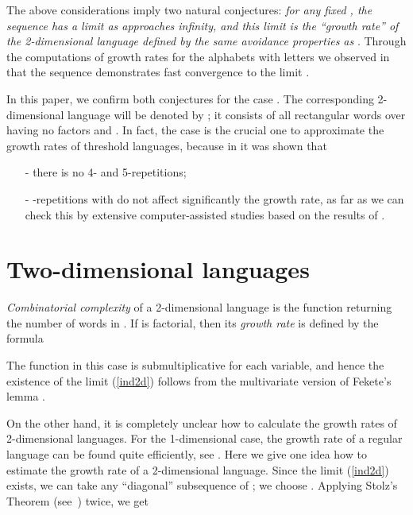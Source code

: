 \documentclass[submission,copyright]{eptcs}\providecommand{\event}{WORDS 2011}
\begin{document}
\smallskip
The above considerations imply two natural conjectures: \textit{for any fixed , the sequence  has a limit as  approaches infinity, and this limit is the ``growth rate'' of the 2-dimensional language defined by the same avoidance properties as }. Through the computations of growth rates for the alphabets with  letters we observed in \cite{ShGo} that the sequence  demonstrates fast convergence to the limit .

In this paper, we confirm both conjectures for the case . The corresponding 2-dimen\-sional language will be denoted by ; it consists of all rectangular words over  having no factors  and .
In fact, the case  is the crucial one to approximate the growth rates of threshold languages, because in \cite{ShGo} it was shown that
\begin{itemize}
\item[-] there is no 4- and 5-repetitions;
\item[-] -repetitions with  do not affect significantly the growth rate, as far as we can check this by extensive computer-assisted studies based on the results of \cite{Sh1}.
\end{itemize}

\section {Two-dimensional languages}
\textit{Combinatorial complexity}  of a 2-dimensional language  is the function returning the number of  words in . If  is factorial, then its \textit{growth rate} is defined by the formula 

The function  in this case is submultiplicative for each variable, and hence the existence of the limit (\ref{ind2d}) follows from the multivariate version of Fekete's lemma \cite{Cap}.

On the other hand, it is completely unclear how to calculate the growth rates of 2-dimensional languages. For the 1-dimensional case, the growth rate of a regular language can be found quite efficiently, see \cite{Sh1}. Here we give one idea how to estimate the growth rate of a 2-dimen\-sional language. Since the limit (\ref{ind2d}) exists, we can take any ``diagonal'' subsequence of ; we choose . Applying Stolz's Theorem (see~\cite{Fih}) twice, we get
\end{document}

